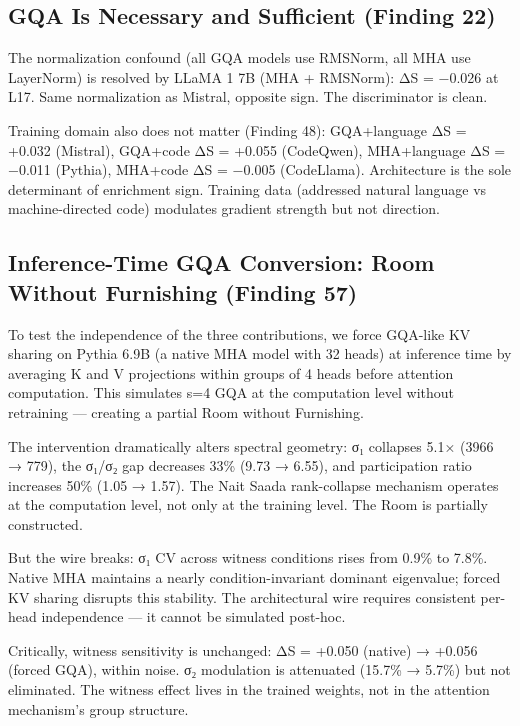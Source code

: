 \documentclass[12pt]{article}
\begin{document}
\subsection{GQA Is Necessary and Sufficient (Finding 22)}

The normalization confound (all GQA models use RMSNorm, all MHA use LayerNorm) is resolved by LLaMA 1 7B (MHA + RMSNorm): ΔS = −0.026 at L17. Same normalization as Mistral, opposite sign. The discriminator is clean.

Training domain also does not matter (Finding 48): GQA+language ΔS = +0.032 (Mistral), GQA+code ΔS = +0.055 (CodeQwen), MHA+language ΔS = −0.011 (Pythia), MHA+code ΔS = −0.005 (CodeLlama). Architecture is the sole determinant of enrichment sign. Training data (addressed natural language vs machine-directed code) modulates gradient strength but not direction.

\subsection{Inference-Time GQA Conversion: Room Without Furnishing (Finding 57)}

To test the independence of the three contributions, we force GQA-like KV sharing on Pythia 6.9B (a native MHA model with 32 heads) at inference time by averaging K and V projections within groups of 4 heads before attention computation. This simulates s=4 GQA at the computation level without retraining — creating a partial Room without Furnishing.

The intervention dramatically alters spectral geometry: σ₁ collapses 5.1× (3966 → 779), the σ₁/σ₂ gap decreases 33\% (9.73 → 6.55), and participation ratio increases 50\% (1.05 → 1.57). The Nait Saada rank-collapse mechanism operates at the computation level, not only at the training level. The Room is partially constructed.

But the wire breaks: σ₁ CV across witness conditions rises from 0.9\% to 7.8\%. Native MHA maintains a nearly condition-invariant dominant eigenvalue; forced KV sharing disrupts this stability. The architectural wire requires consistent per-head independence — it cannot be simulated post-hoc.

Critically, witness sensitivity is unchanged: ΔS = +0.050 (native) → +0.056 (forced GQA), within noise. σ₂ modulation is attenuated (15.7\% → 5.7\%) but not eliminated. The witness effect lives in the trained weights, not in the attention mechanism's group structure.
\end{document}
